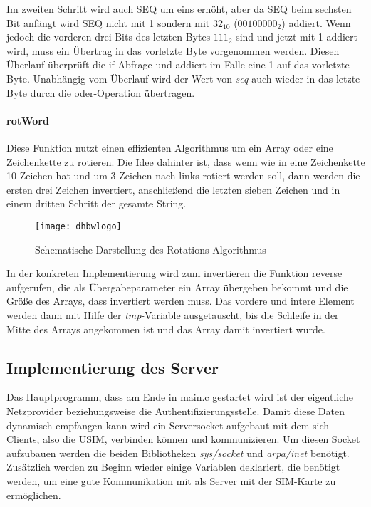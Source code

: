 		Im zweiten Schritt wird auch SEQ um eins erhöht, aber da SEQ beim sechsten Bit anfängt wird SEQ nicht mit
		1 sondern mit $32_{10}$ ($00100000_2$) addiert. Wenn jedoch die vorderen drei Bits des letzten Bytes $111_2$ sind
		und jetzt mit 1 addiert wird, muss ein Übertrag in das vorletzte Byte vorgenommen werden. Diesen Überlauf
		überprüft die if-Abfrage und addiert im Falle eine 1 auf das vorletzte Byte. Unabhängig vom Überlauf wird
		der Wert von \emph{seq} auch wieder in das letzte Byte durch die oder-Operation übertragen.

		\paragraph{rotWord}
		Diese Funktion nutzt einen effizienten Algorithmus um ein Array oder eine Zeichenkette zu rotieren. Die
		Idee dahinter ist, dass	wenn wie in  eine Zeichenkette 10 Zeichen hat und um 3 Zeichen
		nach links rotiert werden soll, dann werden die ersten drei Zeichen invertiert, anschließend die letzten
		sieben Zeichen und in einem dritten Schritt der gesamte String.
		\begin{figure}[htp]
			\begin{center}
				\texttt{[image: dhbwlogo]}
			\end{center}
			\caption{Schematische Darstellung des Rotations-Algorithmus}
			\label{fig:rotWord}
		\end{figure}
		
		In der konkreten Implementierung wird zum invertieren die Funktion reverse aufgerufen, die als
		Übergabeparameter ein Array übergeben bekommt und die Größe des Arrays, dass invertiert werden muss.
		Das vordere und intere Element werden dann mit Hilfe der \emph{tmp}-Variable ausgetauscht, bis die Schleife
		in der Mitte des Arrays angekommen ist und das Array damit invertiert wurde.
		
	\subsection{Implementierung des Server}
	Das Hauptprogramm, dass am Ende in main.c gestartet wird ist der eigentliche Netzprovider beziehungsweise
	die Authentifizierungsstelle. Damit diese Daten dynamisch empfangen kann wird ein Serversocket aufgebaut
	mit dem sich Clients, also die USIM, verbinden können und kommunizieren. Um diesen Socket aufzubauen werden
	die beiden Bibliotheken \emph{sys/socket} und \emph{arpa/inet} benötigt. Zusätzlich werden zu Beginn wieder
	einige Variablen deklariert, die benötigt werden, um eine gute Kommunikation mit als Server mit der SIM-Karte
	zu ermöglichen.
	
